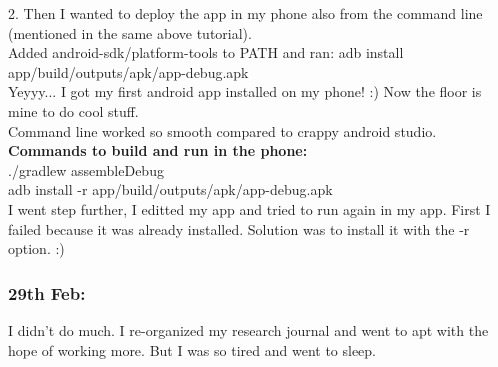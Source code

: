 \documentclass[11pt]{article}
\begin{document}
2. Then I wanted to deploy the app in my phone also from the command line (mentioned in the same above tutorial).\\
Added android-sdk/platform-tools to PATH and ran: adb install app/build/outputs/apk/app-debug.apk\\
Yeyyy... I got my first android app installed on my phone! :) Now the floor is mine to do cool stuff.\\

Command line worked so smooth compared to crappy android studio. \\
\textbf{Commands to build and run in the phone:}\\
./gradlew assembleDebug\\
adb install -r app/build/outputs/apk/app-debug.apk\\

I went step further, I editted my app and tried to run again in my app. First I failed because it was already installed. Solution was to install it 
with the -r option. :)

\subsubsection*{29th Feb:}
I didn't do much. I re-organized my research journal and went to apt with the hope of working more. But I was so tired and went to sleep.
\end{document}
